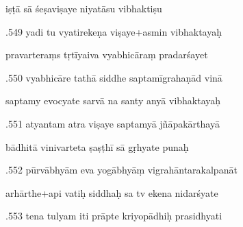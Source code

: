 \documentclass[article,12pt,a4paper]{memoir}%
\newcounter{parCount}
\begin{document}
	  
	  \pstart \leavevmode%
	iṣṭā sā śeṣaviṣaye niyatāsu vibhaktiṣu 
	{}
	\pend%
      

	  
	  \pstart {}.549 yadi tu vyatirekeṇa viṣaye+asmin vibhaktayaḥ 
	{}
	\pend%
      

	  
	  \pstart \leavevmode%
	pravarteraṃs tṛtīyaiva vyabhicāraṃ pradarśayet 
	{}
	\pend%
      

	  
	  \pstart {}.550 vyabhicāre tathā siddhe saptamīgrahaṇād vinā 
	{}
	\pend%
      

	  
	  \pstart \leavevmode%
	saptamy evocyate sarvā na santy anyā vibhaktayaḥ 
	{}
	\pend%
      

	  
	  \pstart {}.551 atyantam atra viṣaye saptamyā jñāpakārthayā 
	{}
	\pend%
      

	  
	  \pstart \leavevmode%
	bādhitā vinivarteta ṣaṣṭhī sā gṛhyate punaḥ 
	{}
	\pend%
      

	  
	  \pstart {}.552 pūrvābhyām eva yogābhyāṃ   vigrahāntarakalpanāt 
	{}
	\pend%
      

	  
	  \pstart \leavevmode%
	arhārthe+api vatiḥ siddhaḥ sa tv ekena nidarśyate 
	{}
	\pend%
      

	  
	  \pstart {}.553 tena tulyam iti prāpte kriyopādhiḥ prasidhyati 
	{}
	\pend%
      
\end{document}
